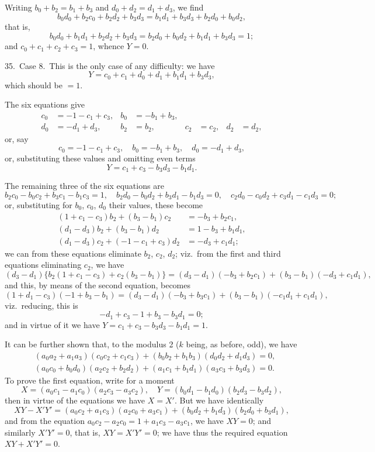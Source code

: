 \documentclass[11pt,a4paper]{article}
\theoremstyle{definition}
\begin{document}
Writing $b_0 + b_2 = b_1 + b_3$ and $d_0 + d_2 = d_1 + d_3$, we find
\[
b_0d_0 + b_2c_0 + b_2d_2 + b_3d_3 = b_1d_1 + b_3d_3 + b_2d_0 + b_0d_2,
\]
that is,
\[
b_0d_0 + b_1d_1 + b_2d_2 + b_3d_3 = b_2d_0 + b_0d_2 + b_1d_1 + b_3d_3 = 1;
\]
and $c_0 + c_1 + c_2 + c_3 = 1$, whence $Y = 0$.

\medskip

35.\ Case 8.\ This is the only case of any difficulty: we have
\[
Y = c_0 + c_1 + d_0 + d_1 + b_1d_1 + b_3d_3,
\]
which should be $= 1$.

The six equations give
\begin{align*}
c_0 &= -1 - c_1 + c_3, & b_0 &= -b_1 + b_3,\\
d_0 &= -d_1 + d_3, & b_2 &= b_2, & c_2 &= c_2, & d_2 &= d_2,
\end{align*}
or, say
\[
c_0 = -1 - c_1 + c_3, \quad b_0 = -b_1 + b_3, \quad d_0 = -d_1 + d_3,
\]
or, substituting these values and omitting even terms
\[
Y = c_1 + c_3 - b_3d_3 - b_1d_1.
\]

The remaining three of the six equations are
\[
b_2c_0 - b_0c_2 + b_3c_1 - b_1c_3 = 1, \quad b_2d_0 - b_0d_2 + b_3d_1 - b_1d_3 = 0, \quad c_2d_0 - c_0d_2 + c_3d_1 - c_1d_3 = 0;
\]
or, substituting for $b_0$, $c_0$, $d_0$ their values, these become
\begin{align*}
(1 + c_1 - c_3)b_2 + (b_3 - b_1)c_2 &= -b_3 + b_2c_1,\\
(d_1 - d_3)b_2 + (b_3 - b_1)d_2 &= 1 - b_3 + b_1d_1,\\
(d_1 - d_3)c_2 + (-1 - c_1 + c_3)d_2 &= -d_3 + c_1d_1;
\end{align*}
we can from these equations eliminate $b_2$, $c_2$, $d_2$; viz.\ from the first and third equations eliminating $c_2$, we have
\[
(d_3 - d_1)\{b_2(1 + c_1 - c_3) + c_2(b_3 - b_1)\} = (d_3 - d_1)(-b_3 + b_2c_1) + (b_3 - b_1)(-d_3 + c_1d_1),
\]
and this, by means of the second equation, becomes
\[
(1 + d_1 - c_3)(-1 + b_3 - b_1) = (d_3 - d_1)(-b_3 + b_3c_1) + (b_3 - b_1)(-c_1d_1 + c_1d_1),
\]
viz.\ reducing, this is
\[
-d_1 + c_3 - 1 + b_3 - b_3d_1 = 0;
\]
and in virtue of it we have $Y = c_1 + c_3 - b_3d_3 - b_1d_1 = 1$.

It can be further shown that, to the modulus 2 ($k$ being, as before, odd), we have
\begin{align*}
&(a_0a_2 + a_1a_3)(c_0c_2 + c_1c_3) + (b_0b_2 + b_1b_3)(d_0d_2 + d_1d_3) = 0,\\
&(a_0c_0 + b_0d_0)(a_2c_2 + b_2d_2) + (a_1c_1 + b_1d_1)(a_3c_3 + b_3d_3) = 0.
\end{align*}
To prove the first equation, write for a moment
\[
X = (a_0c_1 - a_1c_0)(a_2c_3 - a_3c_2), \quad Y = (b_0d_1 - b_1d_0)(b_2d_3 - b_3d_2),
\]
then in virtue of the equations we have $X = X'$. But we have identically
\[
XY - X'Y' = (a_0c_2 + a_1c_3)(a_2c_0 + a_3c_1) + (b_0d_2 + b_1d_3)(b_2d_0 + b_3d_1),
\]
and from the equation $a_0c_2 - a_2c_0 = 1 + a_1c_3 - a_3c_1$, we have $XY = 0$; and similarly $X'Y' = 0$, that is, $XY = X'Y' = 0$; we have thus the required equation $XY + X'Y' = 0$.
\end{document}

